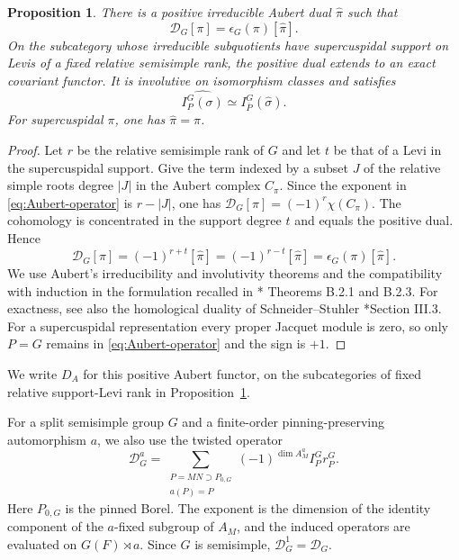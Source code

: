 \documentclass[12pt]{amsart}
\theoremstyle{definition}
\theoremstyle{plain}
\newtheorem{proposition}[definition]{Proposition}
\theoremstyle{remark}
\numberwithin{equation}{section}
\begin{document}
\begin{proposition}\label{prop:Aubert}
There is a positive irreducible Aubert dual $\widehat\pi$ such that
\[
 \mathcal D_G[\pi]=\epsilon_G(\pi)[\widehat\pi].
\]
On the subcategory whose irreducible subquotients have supercuspidal
support on Levis of a fixed relative semisimple rank, the positive dual extends
to an exact covariant functor. It is involutive on isomorphism classes
and satisfies
\[
 \widehat{I_P^G(\sigma)}\simeq I_{\overline P}^G(\widehat\sigma).
\]
For supercuspidal $\pi$, one has $\widehat\pi=\pi$.
\end{proposition}
\begin{proof}
Let $r$ be the relative semisimple rank of $G$ and let $t$ be that
of a Levi in the supercuspidal support. Give the term indexed by a subset $J$ of the relative simple roots
degree $|J|$ in the Aubert complex $C_\pi$. Since the exponent in
\eqref{eq:Aubert-operator} is $r-|J|$, one has
$\mathcal D_G[\pi]=(-1)^r\chi(C_\pi)$.
The cohomology is concentrated in the support degree $t$ and equals
the positive dual. Hence
\[
 \mathcal D_G[\pi]=(-1)^{r+t}[\widehat\pi]
      =(-1)^{r-t}[\widehat\pi]
      =\epsilon_G(\pi)[\widehat\pi].
\]
We use Aubert's irreducibility and involutivity theorems and the
compatibility with induction in the formulation recalled in
\cite{AtobeGanEtAl2025-LocalIntertwiningRelationsCoTemperedPackets}*{
Theorems B.2.1 and B.2.3}. For exactness, see also the homological
duality of Schneider--Stuhler
\cite{SchneiderStuhler1997-RepresentationTheorySheaves}*{Section III.3}.
For a supercuspidal representation every proper
Jacquet module is zero, so only $P=G$ remains in
\eqref{eq:Aubert-operator} and the sign is $+1$.
\end{proof}

We write $D_A$ for this positive Aubert functor, on the subcategories of fixed relative support-Levi rank in Proposition~\ref{prop:Aubert}.

For a split semisimple group $G$ and a finite-order
pinning-preserving automorphism $a$, we also use the twisted
operator
\begin{equation}\label{eq:twisted-Aubert-operator}
 \mathcal D_G^a=
  \sum_{\substack{P=MN\supset P_{0,G}\\a(P)=P}}
    (-1)^{\dim A_M^a}I_P^G r_P^G.
\end{equation}
Here $P_{0,G}$ is the pinned Borel. The exponent is the dimension
of the identity component of the $a$-fixed subgroup of $A_M$,
and the induced operators are evaluated on $G(F)\rtimes a$.
Since $G$ is semisimple,
$\mathcal D_G^1=\mathcal D_G$.
\end{document}
